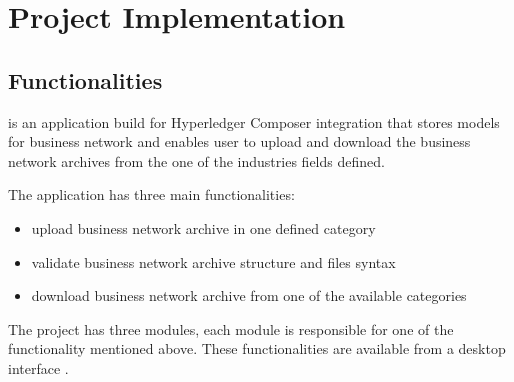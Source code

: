 \chapter{Project Implementation}
\label{chapter:chapter3}

\section{Functionalities}
\label{sub-sec:chapter3-section1}
\textbf{\project} is an application build for Hyperledger Composer integration that stores models for business network and enables user to upload and download the business network archives from the one of the industries fields defined.

The application has three main functionalities:
\begin{itemize}
	\item upload business network archive in one defined category
	\item validate business network archive structure and files syntax
	\item download business network archive from one of the available categories
\end{itemize}
The project has three modules, each module is responsible for one of the functionality mentioned above.
These functionalities are available from a desktop interface .



